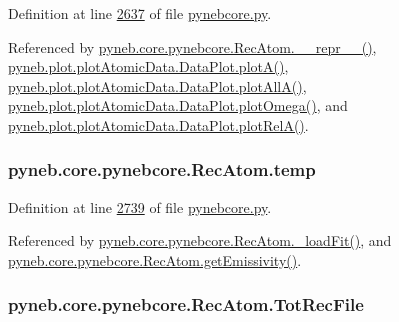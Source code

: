 Definition at line \hyperlink{pynebcore_8py_source_l02637}{2637} of file \hyperlink{pynebcore_8py_source}{pynebcore.\-py}.



Referenced by \hyperlink{pynebcore_8py_source_l03154}{pyneb.\-core.\-pynebcore.\-Rec\-Atom.\-\_\-\-\_\-repr\-\_\-\-\_\-()}, \hyperlink{plot_atomic_data_8py_source_l00117}{pyneb.\-plot.\-plot\-Atomic\-Data.\-Data\-Plot.\-plot\-A()}, \hyperlink{plot_atomic_data_8py_source_l00189}{pyneb.\-plot.\-plot\-Atomic\-Data.\-Data\-Plot.\-plot\-All\-A()}, \hyperlink{plot_atomic_data_8py_source_l00373}{pyneb.\-plot.\-plot\-Atomic\-Data.\-Data\-Plot.\-plot\-Omega()}, and \hyperlink{plot_atomic_data_8py_source_l00262}{pyneb.\-plot.\-plot\-Atomic\-Data.\-Data\-Plot.\-plot\-Rel\-A()}.

\hypertarget{classpyneb_1_1core_1_1pynebcore_1_1_rec_atom_afdcfb955b81391dabcb298fe4990e33c}{
\subsubsection[{temp}]{\setlength{\rightskip}{0pt plus 5cm}pyneb.\-core.\-pynebcore.\-Rec\-Atom.\-temp}}\label{classpyneb_1_1core_1_1pynebcore_1_1_rec_atom_afdcfb955b81391dabcb298fe4990e33c}


Definition at line \hyperlink{pynebcore_8py_source_l02739}{2739} of file \hyperlink{pynebcore_8py_source}{pynebcore.\-py}.



Referenced by \hyperlink{pynebcore_8py_source_l02754}{pyneb.\-core.\-pynebcore.\-Rec\-Atom.\-\_\-load\-Fit()}, and \hyperlink{pynebcore_8py_source_l02990}{pyneb.\-core.\-pynebcore.\-Rec\-Atom.\-get\-Emissivity()}.

\hypertarget{classpyneb_1_1core_1_1pynebcore_1_1_rec_atom_a3654e24299df680fe969486399e27880}{
\subsubsection[{Tot\-Rec\-File}]{\setlength{\rightskip}{0pt plus 5cm}pyneb.\-core.\-pynebcore.\-Rec\-Atom.\-Tot\-Rec\-File}}\label{classpyneb_1_1core_1_1pynebcore_1_1_rec_atom_a3654e24299df680fe969486399e27880}


